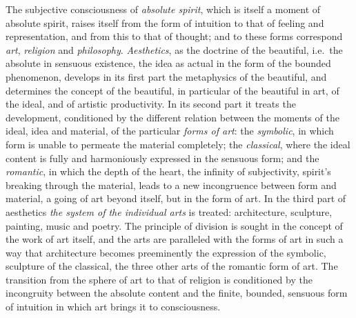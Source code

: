 The subjective consciousness of \emph{absolute spirit}, which is itself
a moment of absolute spirit, raises itself from the form of intuition to
that of feeling and representation, and from this to that of thought;
and to these forms correspond \emph{art}, \emph{religion} and
\emph{philosophy}. \emph{Aesthetics}, as the doctrine of the beautiful,
i.e.\ the absolute in sensuous existence, the idea as actual in the form
of the bounded phenomenon, develops in its first part the metaphysics of
the beautiful, and determines the concept of the beautiful, in
particular of the beautiful in art, of the ideal, and of artistic
productivity. In its second part it treats the development, conditioned
by the different relation between the moments of the ideal, idea and
material, of the particular \emph{forms of art}: the \emph{symbolic}, in
which form is unable to permeate the material completely; the
\emph{classical}, where the ideal content is fully and harmoniously
expressed in the sensuous form; and the \emph{romantic}, in which the
depth of the heart, the infinity of subjectivity, spirit's breaking
through the material, leads to a new incongruence between form and
material, a going of art beyond itself, but in the form of art. In the
third part of aesthetics \emph{the system of the individual arts} is
treated: architecture,
sculp\setcounter{footnote}{0}ture, painting, music and
poetry. The principle of division is sought in the concept of the work
of art itself, and the arts are paralleled with the forms of art in such
a way that architecture becomes preeminently the expression of the
symbolic, sculpture of the classical, the three other arts of the
romantic form of art. The transition from the sphere of art to that of
religion is conditioned by the incongruity between the absolute content
and the finite, bounded, sensuous form of intuition in which art brings
it to consciousness.

